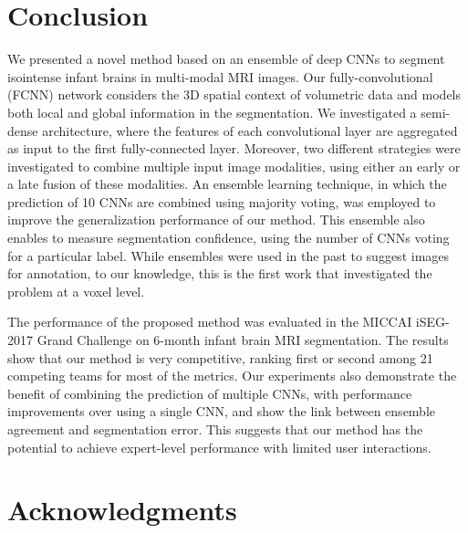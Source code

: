 \documentclass[twoside,espcrc2]{elsarticle}
\begin{document}

\section{Conclusion}

We presented a novel method based on an ensemble of deep CNNs to segment isointense infant brains in multi-modal MRI images. Our fully-convolutional (FCNN) network considers the 3D spatial context of volumetric data and models both local and global information in the segmentation. We investigated a semi-dense architecture, where the features of each convolutional layer are aggregated as input to the first fully-connected layer. Moreover, two different strategies were investigated to combine multiple input image modalities, using either an early or a late fusion of these modalities. An ensemble learning technique, in which the prediction of 10 CNNs are combined using majority voting, was employed to improve the generalization performance of our method. This ensemble also enables to measure segmentation confidence, using the number of CNNs voting for a particular label. While ensembles  were used in the past to suggest images for annotation, to our knowledge, this is the first work that investigated the problem at a voxel level.

The performance of the proposed method was evaluated in the MICCAI iSEG-2017 Grand Challenge on 6-month infant brain MRI segmentation. The results show that our method is very competitive, ranking first or second among 21 competing teams for most of the metrics. Our experiments also demonstrate the benefit of combining the prediction of multiple CNNs, with performance improvements over using a single CNN, and show the link between ensemble agreement and segmentation error. This suggests that our method has the potential to achieve expert-level performance with limited user interactions. 

\section*{Acknowledgments}
\end{document}
